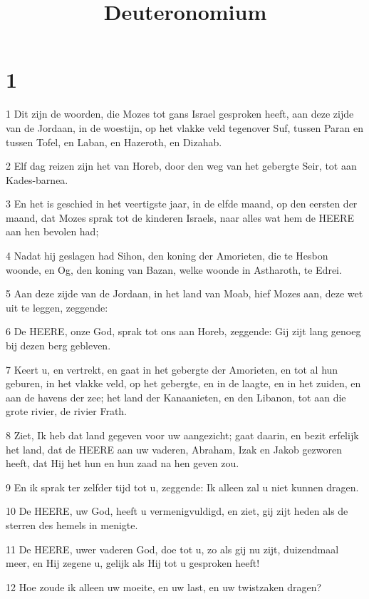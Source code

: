 

\title{Deuteronomium}



\chapter{1}

\par 1 Dit zijn de woorden, die Mozes tot gans Israel gesproken heeft, aan deze zijde van de Jordaan, in de woestijn, op het vlakke veld tegenover Suf, tussen Paran en tussen Tofel, en Laban, en Hazeroth, en Dizahab.
\par 2 Elf dag reizen zijn het van Horeb, door den weg van het gebergte Seir, tot aan Kades-barnea.
\par 3 En het is geschied in het veertigste jaar, in de elfde maand, op den eersten der maand, dat Mozes sprak tot de kinderen Israels, naar alles wat hem de HEERE aan hen bevolen had;
\par 4 Nadat hij geslagen had Sihon, den koning der Amorieten, die te Hesbon woonde, en Og, den koning van Bazan, welke woonde in Astharoth, te Edrei.
\par 5 Aan deze zijde van de Jordaan, in het land van Moab, hief Mozes aan, deze wet uit te leggen, zeggende:
\par 6 De HEERE, onze God, sprak tot ons aan Horeb, zeggende: Gij zijt lang genoeg bij dezen berg gebleven.
\par 7 Keert u, en vertrekt, en gaat in het gebergte der Amorieten, en tot al hun geburen, in het vlakke veld, op het gebergte, en in de laagte, en in het zuiden, en aan de havens der zee; het land der Kanaanieten, en den Libanon, tot aan die grote rivier, de rivier Frath.
\par 8 Ziet, Ik heb dat land gegeven voor uw aangezicht; gaat daarin, en bezit erfelijk het land, dat de HEERE aan uw vaderen, Abraham, Izak en Jakob gezworen heeft, dat Hij het hun en hun zaad na hen geven zou.
\par 9 En ik sprak ter zelfder tijd tot u, zeggende: Ik alleen zal u niet kunnen dragen.
\par 10 De HEERE, uw God, heeft u vermenigvuldigd, en ziet, gij zijt heden als de sterren des hemels in menigte.
\par 11 De HEERE, uwer vaderen God, doe tot u, zo als gij nu zijt, duizendmaal meer, en Hij zegene u, gelijk als Hij tot u gesproken heeft!
\par 12 Hoe zoude ik alleen uw moeite, en uw last, en uw twistzaken dragen?
